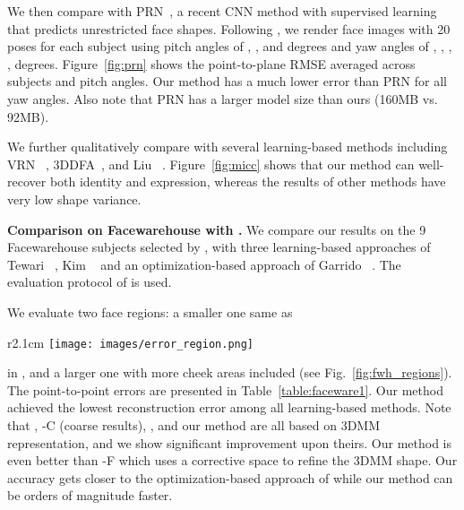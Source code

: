 \documentclass[10pt,twocolumn,letterpaper]{article}
\begin{document}
We then compare with PRN~\cite{feng2018joint}, a recent CNN method with supervised learning that predicts unrestricted face shapes.
Following \cite{feng2018joint}, we render face images with 20 poses for each subject using pitch angles of , , and  degrees and yaw angles of , , , ,  degrees. Figure~\ref{fig:prn} shows the point-to-plane RMSE averaged across subjects and pitch angles. Our method has a much lower error than PRN for all yaw angles. Also note that PRN has a larger model size than ours (160MB vs. 92MB).

We further qualitatively compare with several learning-based methods including VRN ~\cite{jackson2017large}, 3DDFA~\cite{zhu2016face}, and Liu \etal~\cite{liu2018disentangling}. Figure~\ref{fig:micc} shows that our method can well-recover both identity and expression, whereas the results of other methods have very low shape variance.

\vspace{6pt}
\noindent\textbf{Comparison on Facewarehouse with \cite{tewari2018self,tewari2017mofa,kim2018inversefacenet,garrido2016reconstruction}.}
We compare our results on the 9 Facewarehouse subjects selected by \cite{tewari2018self}, with three learning-based approaches
of Tewari \etal~\cite{tewari2017mofa,tewari2018self}, Kim \etal~\cite{kim2018inversefacenet} and an optimization-based approach of Garrido \etal~\cite{garrido2016reconstruction}.
The evaluation protocol of \cite{tewari2018self} is used.


We evaluate two face regions: a smaller one same as
\setlength{\columnsep}{0pt}\setlength{\intextsep}{0pt}
\begin{wrapfigure}[6]{r}{2.1cm}
	\centering
	\texttt{[image: images/error\_region.png]}
	\caption{\label{fig:fwh_regions}}
\end{wrapfigure}
in \cite{tewari2018self}, and a larger one with more cheek areas included (see Fig.~\ref{fig:fwh_regions}). The point-to-point errors are presented in Table~\ref{table:faceware1}. Our method achieved the lowest reconstruction error among all learning-based methods. Note that \cite{tewari2017mofa}, \cite{tewari2018self}-C (coarse results), \cite{kim2018inversefacenet}, and our method are all based on 3DMM representation, and we show significant improvement upon theirs. Our method is even better than \cite{tewari2018self}-F which uses a corrective space to refine the 3DMM shape. Our accuracy gets closer to the optimization-based approach of \cite{garrido2016reconstruction} while our method can be orders of magnitude faster. 
\end{document}
